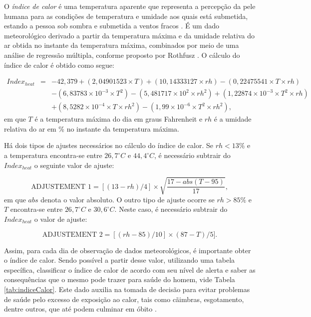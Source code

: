 O \emph{índice de calor} é uma temperatura aparente que representa a percepção da pele humana para as condições de temperatura e umidade aos quais está submetida, estando a pessoa sob sombra e submetida a ventos fracos \cite{Steadman:IndiceCalor}. É um dado meteorológico derivado a partir da temperatura máxima e da umidade relativa do ar obtida no instante da temperatura máxima, combinados por meio de uma análise de regressão múltipla, conforme proposto por Rothfusz \cite{Rothfusz:HeatIndex}. O cálculo do índice de calor é obtido como segue:

\begin{eqnarray}
Index_{heat} &=& - 42,379 + (2,04901523 \times T) + (10,14333127 \times rh) - (0,22475541 \times T \times rh) \nonumber\\
& \ &  - (6,83783 \times 10^{-3}\times T^2) - (5,481717 \times 10^2 \times rh^2) + (1,22874 \times 10^{-3} \times T^2 \times rh)  \nonumber\\
& \ &  + (8,5282 \times 10^{-4} \times T \times rh^2) - (1,99 \times 10^{-6} \times T^2 \times rh^2),
\end{eqnarray} em que $T$ é a temperatura máxima do dia em graus Fahrenheit e $rh$ é a umidade relativa do ar em \% no instante da temperatura máxima.

Há dois tipos de ajustes necessários no cálculo do índice de calor. Se $rh < 13\%$ e a temperatura encontra-se entre $26,7 ^{\circ}C$ e $44,4 ^{\circ}C$, é necessário subtrair do $Index_{heat}$ o seguinte valor de ajuste:

\begin{equation}
\textrm{ADJUSTEMENT 1} = [(13-rh)/4] \times \sqrt{\frac{17 - abs(T - 95)}{17}},
\end{equation} em que $abs$ denota o valor absoluto. O outro tipo de ajuste ocorre se $rh > 85\%$ e $T$ encontra-se entre $26,7 ^{\circ}C$ e $30,6 ^{\circ}C$. Neste caso, é necessário subtrair do $Index_{heat}$ o valor de ajuste:

\begin{equation}
\textrm{ADJUSTEMENT 2} = [(rh - 85)/10]\times(87-T)/5].
\end{equation}

Assim, para cada dia de observação de dados meteorológicos, é importante obter o índice de calor. Sendo possível a partir desse valor, utilizando uma tabela específica, classificar o índice de calor de acordo com seu nível de alerta e saber as consequências que o mesmo pode trazer para saúde do homem, vide Tabela \ref{tab:indiceCalor}. Este dado auxilia na tomada de decisão para evitar problemas de saúde pelo excesso de exposição ao calor, tais como cãimbras, esgotamento, dentre outros, que até podem culminar em óbito \cite{Silva:CalorTrabalho,Lima:Artigo}.

